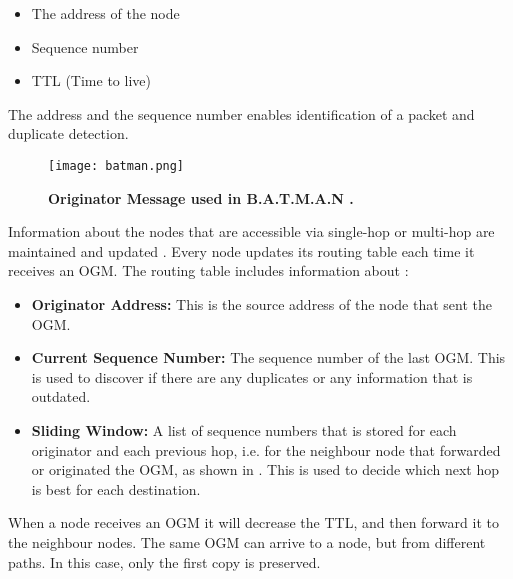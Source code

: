 \begin{itemize}
\item The address of the node
\item Sequence number
\item TTL (Time to live)
\end{itemize}

The address and the sequence number enables identification of a packet and duplicate detection. 

\begin{figure}[b]
  \centering
    \texttt{[image: batman.png]}
     \caption[Originator Message in B.A.T.M.A.N]{\textbf{Originator Message used in B.A.T.M.A.N \cite{batman2}.}}
\label{fig:batman} 
\end{figure}


Information about the nodes that are accessible via single-hop or multi-hop are maintained and updated \cite{batman}. Every node updates its routing table each time it receives an OGM. The routing table includes information about \cite{batman2}:

\begin{itemize}
  \item \textbf{Originator Address:} This is the source address of the node that sent the OGM.
  \item \textbf{Current Sequence Number:} The sequence number of the last OGM. This is used to discover if there are any duplicates or any information that is outdated.
  \item \textbf{Sliding Window:} A list of sequence numbers that is stored for each originator and each previous hop, i.e. for the neighbour node that forwarded or originated the OGM, as shown in . This is used to decide which next hop is best for each destination. 
\end{itemize}

When a node receives an OGM it will decrease the TTL, and then forward it to the neighbour nodes. The same OGM can arrive to a node, but from different paths. In this case, only the first copy is preserved. 


